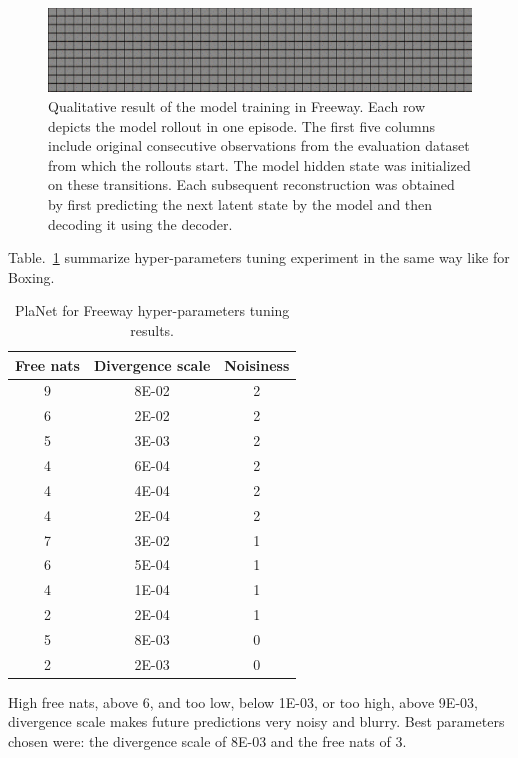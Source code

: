 \begin{figure}[H]
\includegraphics[width=1\textwidth,keepaspectratio]{figures/PlaNet/Freeway_memory_sharp.png}
\caption[Qualitative result of the PlaNet model training with a lower divergence scale in Freeway]{Qualitative result of the model training in Freeway. Each row depicts the model rollout in one episode. The first five columns include original consecutive observations from the evaluation dataset from which the rollouts start. The model hidden state was initialized on these transitions. Each subsequent reconstruction was obtained by first predicting the next latent state by the model and then decoding it using the decoder.}
\label{Fig.PlaNet_Freeway_lower_divergence_scale}
\end{figure}

Table.~\ref{Table.PlaNet_Freeway_tuning} summarize hyper-parameters tuning experiment in the same way like for Boxing.

\begin{table}[H]
\centering
\begin{tabular}{| c | c | c |} 
\hline
Free nats & Divergence scale & Noisiness \\
\hline
9 & 8E-02 & 2 \\
6 & 2E-02 & 2 \\
5 & 3E-03 & 2 \\
4 & 6E-04 & 2 \\
4 & 4E-04 & 2 \\
4 & 2E-04 & 2 \\
7 & 3E-02 & 1 \\
6 & 5E-04 & 1 \\
4 & 1E-04 & 1 \\
2 & 2E-04 & 1 \\
5 & 8E-03 & 0 \\
2 & 2E-03 & 0 \\
\hline
\end{tabular}
\caption{PlaNet for Freeway hyper-parameters tuning results.}
\label{Table.PlaNet_Freeway_tuning}
\end{table}

High free nats, above 6, and too low, below 1E-03, or too high, above 9E-03, divergence scale makes future predictions very noisy and blurry. Best parameters chosen were: the divergence scale of 8E-03 and the free nats of 3.

